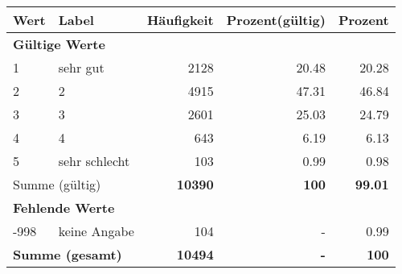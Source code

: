      \begin{longtable}{lXrrr}
     \toprule
     \textbf{Wert} & \textbf{Label} & \textbf{Häufigkeit} & \textbf{Prozent(gültig)} & \textbf{Prozent} \\
     \endhead
     \midrule
     \multicolumn{5}{l}{\textbf{Gültige Werte}}\\

     1 &
     \multicolumn{1}{X}{ sehr gut   } &


       \num{2128} &
       \num[round-mode=places,round-precision=2]{20,48} &
         \num[round-mode=places,round-precision=2]{20,28} \\

     2 &
     \multicolumn{1}{X}{ 2   } &


       \num{4915} &
       \num[round-mode=places,round-precision=2]{47,31} &
         \num[round-mode=places,round-precision=2]{46,84} \\

     3 &
     \multicolumn{1}{X}{ 3   } &


       \num{2601} &
       \num[round-mode=places,round-precision=2]{25,03} &
         \num[round-mode=places,round-precision=2]{24,79} \\

     4 &
     \multicolumn{1}{X}{ 4   } &


       \num{643} &
       \num[round-mode=places,round-precision=2]{6,19} &
         \num[round-mode=places,round-precision=2]{6,13} \\

     5 &
     \multicolumn{1}{X}{ sehr schlecht   } &


       \num{103} &
       \num[round-mode=places,round-precision=2]{0,99} &
         \num[round-mode=places,round-precision=2]{0,98} \\
     \midrule
     \multicolumn{2}{l}{Summe (gültig)} &
       \textbf{\num{10390}} &
     \textbf{100} &
       \textbf{\num[round-mode=places,round-precision=2]{99,01}} \\
     \multicolumn{5}{l}{\textbf{Fehlende Werte}}\\
       -998 &
       keine Angabe &
         \num{104} &
        - &
         \num[round-mode=places,round-precision=2]{0,99} \\
     \midrule
     \multicolumn{2}{l}{\textbf{Summe (gesamt)}} &
          \textbf{\num{10494}} &
        \textbf{-} &
        \textbf{100} \\
     \bottomrule
     \end{longtable}
     
